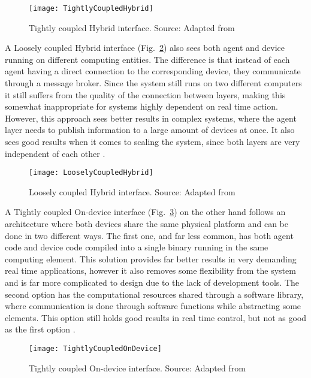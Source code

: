 \begin{figure}[]
	\centering
	\texttt{[image: TightlyCoupledHybrid]}
	\caption{Tightly coupled Hybrid interface. Source: Adapted from \cite{8591641}}
	\label{fig:tightly_coupled_hybrid}
\end{figure}

A Loosely coupled Hybrid interface (Fig.~\ref{fig:loosely_coupled_hybrid}) also sees both agent and device running on different computing entities. The difference is that instead of each agent having a direct connection to the corresponding device, they communicate through a message broker. Since the system still runs on two different computers it still suffers from the quality of the connection between layers, making this somewhat inappropriate for systems highly dependent on real time action. However, this approach sees better results in complex systems, where the agent layer needs to publish information to a large amount of devices at once. It also sees good results when it comes to scaling the system, since both layers are very independent of each other \cite{8591641}.\\

\begin{figure}[]
	\centering
	\texttt{[image: LooselyCoupledHybrid]}
	\caption{Loosely coupled Hybrid interface. Source: Adapted from \cite{8591641}}
	\label{fig:loosely_coupled_hybrid}
\end{figure}

A Tightly coupled On-device interface (Fig.~\ref{fig:tightly_coupled_ondevice}) on the other hand follows an architecture where both devices share the same physical platform and can be done in two different ways. The first one, and far less common, has both agent code and device code compiled into a single binary running in the same computing element. This solution provides far better results in very demanding real time applications, however it also removes some flexibility from the system and is far more complicated to design due to the lack of development tools. The second option has the computational resources shared through a software library, where communication is done through software functions while abstracting some elements. This option still holds good results in real time control, but not as good as the first option \cite{8591641}.\\

\begin{figure}[]
	\centering
	\texttt{[image: TightlyCoupledOnDevice]}
	\caption{Tightly coupled On-device interface. Source: Adapted from \cite{8591641}}
	\label{fig:tightly_coupled_ondevice}
\end{figure}

